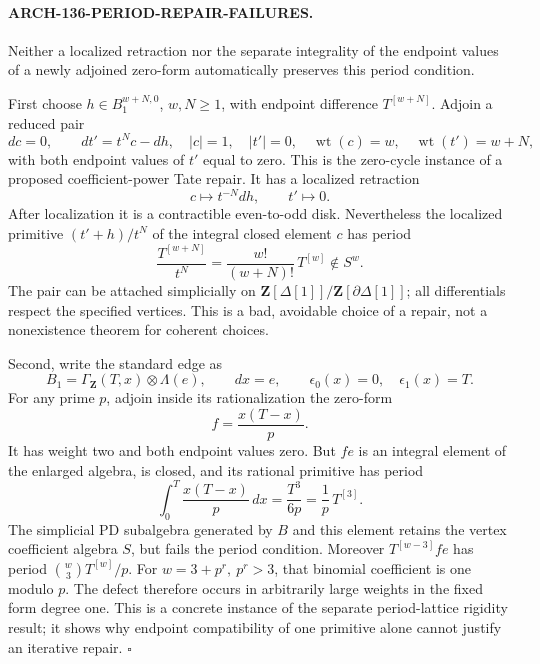\paragraph{ARCH-136-PERIOD-REPAIR-FAILURES.}
Neither a localized retraction nor the separate integrality
of the endpoint values of a newly adjoined zero-form
automatically preserves this period condition.

First choose \(h\in B_1^{w+N,0}\), \(w,N\geq1\), with
endpoint difference \(T^{[w+N]}\). Adjoin a reduced pair
\[
 dc=0,\qquad dt'=t^N c-dh,
 \quad |c|=1,\quad |t'|=0,\quad
 \operatorname{wt}(c)=w,\quad\operatorname{wt}(t')=w+N,
 \tag{136.LT12}
\]
with both endpoint values of \(t'\) equal to zero.
This is the zero-cycle instance of a proposed coefficient-power
Tate repair. It has a localized retraction
\[
                  c\longmapsto t^{-N}dh,\qquad t'\longmapsto0.
 \]
After localization it is a contractible even-to-odd disk.
Nevertheless the localized primitive \((t'+h)/t^N\) of
the integral closed element \(c\) has period
\[
 \frac{T^{[w+N]}}{t^N}
       =\frac{w!}{(w+N)!}\,T^{[w]}\notin S^w.
 \tag{136.LT13}
\]
The pair can be attached simplicially on
\(\mathbf Z[\Delta[1]]/\mathbf Z[\partial\Delta[1]]\);
all differentials respect the specified vertices.
This is a bad, avoidable choice of a repair, not a
nonexistence theorem for coherent choices.

Second, write the standard edge as
\[
 B_1=\Gamma_{\mathbf Z}(T,x)\otimes\Lambda(e),
       \qquad dx=e,\qquad \epsilon_0(x)=0,\quad\epsilon_1(x)=T.
 \]
For any prime \(p\), adjoin inside its rationalization the
zero-form
\[
                         f=\frac{x(T-x)}p.
 \]
It has weight two and both endpoint values zero. But \(fe\)
is an integral element of the enlarged algebra, is closed,
and its rational primitive has period
\[
            \int_0^T\frac{x(T-x)}p\,dx
                         =\frac{T^3}{6p}
                         =\frac1p\,T^{[3]}.
 \tag{136.LT14}
\]
The simplicial PD subalgebra generated by \(B\) and this
element retains the vertex coefficient algebra \(S\),
but fails the period condition. Moreover
\(T^{[w-3]}fe\) has period
\(\binom w3 T^{[w]}/p\). For
\(w=3+p^r,\ p^r>3\), that binomial coefficient is one
modulo \(p\). The defect therefore occurs in arbitrarily
large weights in the fixed form degree one.
This is a concrete instance of the separate period-lattice
rigidity result; it shows why endpoint compatibility of
one primitive alone cannot justify an iterative repair.
\hfill\(\square\)


